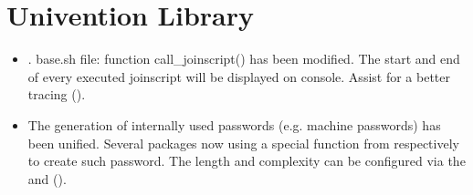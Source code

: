 







\section{Univention Library}
\begin{itemize}

\item {}. base.sh file: function call\_joinscript() has
been modified. The start and end of  every executed joinscript will be
displayed on console. Assist for a better tracing ().

\item The generation of internally used passwords (e.g. machine passwords) has
been unified. Several packages now using a special function from
 respectively  to
create such password. The length and complexity can be configured via the
 and
 ().

\end{itemize}


